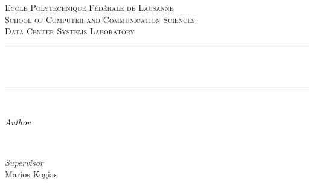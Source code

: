 \makeatletter
{}
\begin{titlepage} %
	\newcommand{\HRule}{\rule{\linewidth}{0.5mm}} %

	\center


	\textsc{\LARGE Ecole Polytechnique Fédérale de Lausanne}\\[1.5cm] %

	\textsc{\Large School of Computer and Communication Sciences}\\[0.5cm] %

	\textsc{\large Data Center Systems Laboratory}\\[0.5cm] %


	\HRule\\[0.4cm]

	{\huge\bfseries \@title}\\[0.4cm] %

	\HRule\\[1.5cm]


	\begin{minipage}{0.4\textwidth}
		\begin{flushleft}
			\large
			\textit{Author}\\
			\@author
		\end{flushleft}
	\end{minipage}
	~
	\begin{minipage}{0.4\textwidth}
		\begin{flushright}
			\large
			\textit{Supervisor}\\
			Marios Kogias
		\end{flushright}
	\end{minipage}

	\vfill\vfill\vfill %

	{\large\@date} %




	\vfill %

\end{titlepage}
